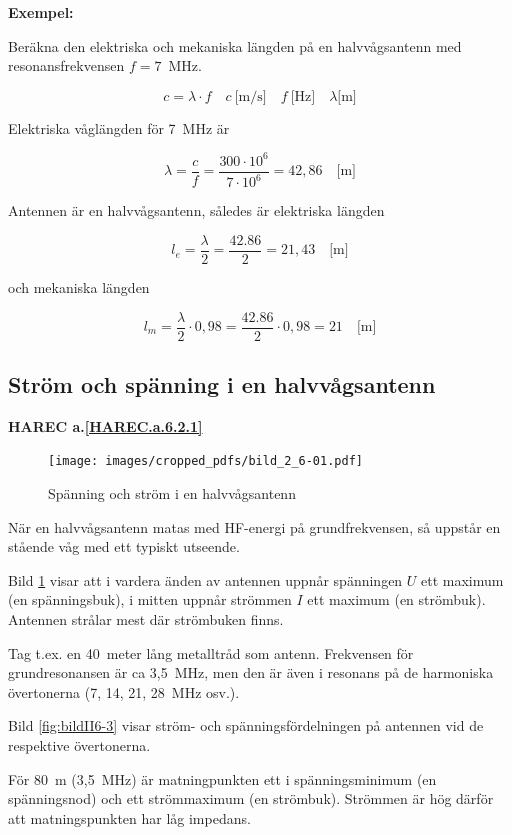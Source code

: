 \textbf{Exempel:}

Beräkna den elektriska och mekaniska längden på en halvvågsantenn med
resonansfrekvensen \(f = 7\)~MHz.

\[
c = \lambda \cdot f
\quad c\ \text{[m/s]} \quad f\ \text{[Hz]} \quad \lambda \text{[m]}
\]

Elektriska våglängden för 7~MHz är

\[
\lambda = \frac{c}{f} = \frac{300 \cdot 10^6}{7 \cdot 10^6} = 42,86
\quad \text{[m]}
\]

Antennen är en halvvågsantenn, således är elektriska längden

\[
l_e = \frac{\lambda}{2} = \frac{42.86}{2} = 21,43 \quad \text{[m]}
\]

och mekaniska längden

\[
l_m = \frac{\lambda}{2} \cdot 0,98 = \frac{42.86}{2}\cdot 0,98 = 21
\quad \text{[m]}
\]


\subsection{Ström och spänning i en halvvågsantenn}
\textbf{
HAREC a.\ref{HAREC.a.6.2.1}\label{myHAREC.a.6.2.1}
}

\begin{figure}
  \texttt{[image: images/cropped\_pdfs/bild\_2\_6-01.pdf]}
  \caption{Spänning och ström i en halvvågsantenn}
  \label{fig:bildII6-1}
\end{figure}

När en halvvågsantenn matas med HF-energi på grundfrekvensen, så uppstår en
stående våg med ett typiskt utseende.

Bild \ref{fig:bildII6-1} visar att i vardera änden av antennen uppnår spänningen
\(U\) ett maximum (en spänningsbuk), i mitten uppnår strömmen \(I\)
ett maximum (en strömbuk).
Antennen strålar mest där strömbuken finns.

Tag t.ex. en 40~meter lång metalltråd som antenn.
Frekvensen för grundresonansen är ca 3,5~MHz, men den är även i resonans på de
harmoniska övertonerna (7, 14, 21, 28~MHz osv.).

Bild \ref{fig:bildII6-3} visar ström- och spänningsfördelningen på antennen vid
de respektive övertonerna.

För 80~m (3,5~MHz) är matningpunkten ett i spänningsminimum (en spänningsnod)
och ett strömmaximum (en strömbuk).
Strömmen är hög därför att matningspunkten har låg impedans.

